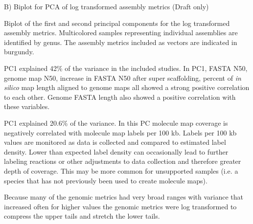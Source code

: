 B) Biplot for PCA of log transformed assembly metrics (Draft only)

Biplot of the first and second principal components for the log transformed assembly metrics. Multicolored samples representing individual assemblies are identified by genus. The assembly metrics included as vectors are indicated in burgundy.

PC1 explained 42\% of the variance in the included studies. In PC1, FASTA N50, genome map N50, increase in FASTA N50 after super scaffolding, percent of \textit{in silico} map length aligned to genome maps all showed a strong positive correlation to each other. Genome FASTA length also showed a positive correlation with these variables.

PC1 explained 20.6\% of the variance. In this PC molecule map coverage is negatively correlated with molecule map labels per 100 kb. Labels per 100 kb values are monitored as data is collected and compared to estimated label density. Lower than expected label density can occasionally lead to further labeling reactions or other adjustments to data collection and therefore greater depth of coverage. This may be more common for unsupported samples (i.e. a species that has not previously been used to create molecule maps).

Because many of the genomic metrics had very broad ranges with variance that increased often for higher values the genomic metrics were log transformed to compress the upper tails and stretch the lower tails.
